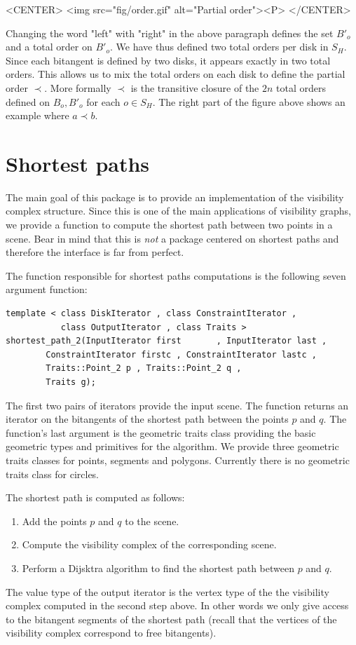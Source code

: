 \begin{ccHtmlOnly}
    <CENTER>
        <img src="fig/order.gif" alt="Partial order"><P>
    </CENTER>
\end{ccHtmlOnly}

Changing the word "left" with "right" in the above paragraph defines the set
$B'_o$ and a total order on $B'_o$. We have thus defined two total orders per
disk in $S_H$. Since each bitangent is defined by two disks, it appears exactly
in two total orders. This allows us to mix the total orders on each disk to
define the partial order $\prec$. More formally $\prec$ is the transitive
closure of the $2n$ total orders defined on $B_o, B'_o$ for each $o \in S_H$.
The right part of the figure above shows an example where $a \prec b$.

\section{Shortest paths}
The main goal of this package is to provide an implementation of the visibility
complex structure. Since this is one of the main applications of visibility
graphs, we provide a function to compute the shortest path between two points in
a scene.  Bear in mind that this is \emph{not} a package centered on shortest
paths and therefore the interface is far from perfect. 

The function responsible for shortest paths computations is the following seven
argument function:

\begin{verbatim}
template < class DiskIterator , class ConstraintIterator ,
           class OutputIterator , class Traits >
shortest_path_2(InputIterator first       , InputIterator last ,
		ConstraintIterator firstc , ConstraintIterator lastc ,
		Traits::Point_2 p , Traits::Point_2 q ,
		Traits g);
\end{verbatim}
The first two pairs of iterators provide the input scene. The function returns
an iterator on the bitangents of the shortest path between the points $p$ and
$q$.  The function's last argument is the geometric traits class providing the
basic geometric types and primitives for the algorithm. We provide three
geometric traits classes for points, segments and polygons. Currently there is
no geometric traits class for circles.

The shortest path is computed as follows:
\begin{enumerate}
    \item Add the points $p$ and $q$ to the scene.
    \item Compute the visibility complex of the corresponding scene.
    \item Perform a Dijsktra algorithm to find the shortest path between $p$ and
    $q$.
\end{enumerate}
The value type of the output iterator is the vertex type of the the visibility
complex computed in the second step above. In other words we only give access to
the bitangent segments of the shortest path (recall that the vertices of the
visibility complex correspond to free bitangents). 


